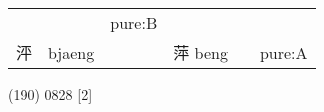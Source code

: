 \documentclass[14pt,a4paper]{scrartcl}
\begin{document}
\begin{longtable}[c]{@{}llllll@{}}
\begin{minipage}[t]{0.14\columnwidth}
\strut\end{minipage} &
\begin{minipage}[t]{0.14\columnwidth}\raggedright\strut
\strut\end{minipage} &
\begin{minipage}[t]{0.14\columnwidth}\raggedright\strut
pure:B
\strut\end{minipage}\tabularnewline
\begin{minipage}[t]{0.14\columnwidth}\raggedright\strut
泙
\strut\end{minipage} &
\begin{minipage}[t]{0.14\columnwidth}\raggedright\strut
bjaeng
\strut\end{minipage} &
\begin{minipage}[t]{0.14\columnwidth}\raggedright\strut
\strut\end{minipage} &
\begin{minipage}[t]{0.14\columnwidth}\raggedright\strut
萍 beng
\strut\end{minipage} &
\begin{minipage}[t]{0.14\columnwidth}\raggedright\strut
\strut\end{minipage} &
\begin{minipage}[t]{0.14\columnwidth}\raggedright\strut
pure:A
\strut\end{minipage}\tabularnewline
\bottomrule
\end{longtable}

(190) 0828 {[}2{]}
\end{document}
